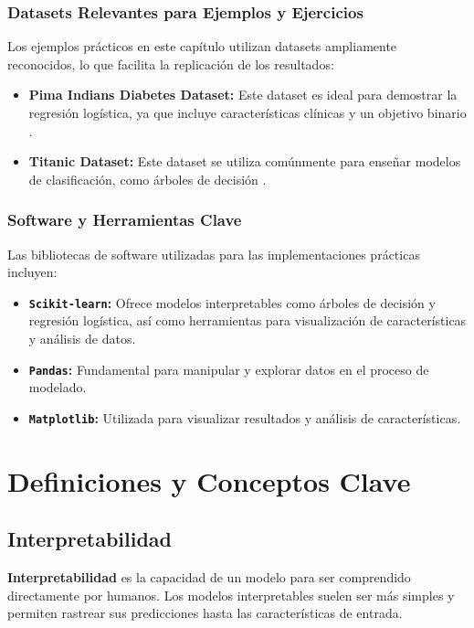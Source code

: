 \begin{refsection}
\subsubsection{Datasets Relevantes para Ejemplos y Ejercicios}
Los ejemplos prácticos en este capítulo utilizan datasets ampliamente reconocidos, lo que facilita la replicación de los resultados:
\begin{itemize}
    \item \textbf{Pima Indians Diabetes Dataset:} Este dataset es ideal para demostrar la regresión logística, ya que incluye características clínicas y un objetivo binario \cite{uci_pima_indians_diabetes}.
    \item \textbf{Titanic Dataset:} Este dataset se utiliza comúnmente para enseñar modelos de clasificación, como árboles de decisión \cite{kaggle_titanic_dataset}.
\end{itemize}


\subsubsection{Software y Herramientas Clave}
Las bibliotecas de software utilizadas para las implementaciones prácticas incluyen:
\begin{itemize}
    \item \textbf{\texttt{Scikit-learn}:} Ofrece modelos interpretables como árboles de decisión y regresión logística, así como herramientas para visualización de características y análisis de datos.
    \item \textbf{\texttt{Pandas}:} Fundamental para manipular y explorar datos en el proceso de modelado.
    \item \textbf{\texttt{Matplotlib}:} Utilizada para visualizar resultados y análisis de características.
\end{itemize}


\section{Definiciones y Conceptos Clave}
\subsection{Interpretabilidad}
\textbf{Interpretabilidad} es la capacidad de un modelo para ser comprendido directamente por humanos. Los modelos interpretables suelen ser más simples y permiten rastrear sus predicciones hasta las características de entrada.


\end{refsection}

